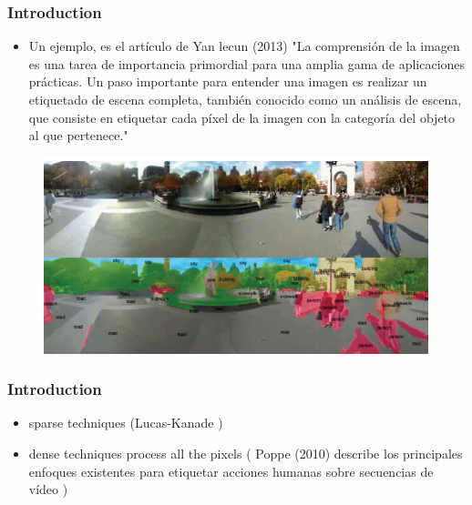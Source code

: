 \documentclass{beamer}
\begin{document}
\begin{frame}
\frametitle{Introduction}
\begin{itemize}
\item Un ejemplo, es el artículo de Yan lecun (2013) "La comprensión de la imagen es una tarea de importancia primordial para una amplia gama de aplicaciones prácticas. Un paso importante para entender una imagen es realizar un etiquetado de escena completa, también conocido como un análisis de escena, que consiste en etiquetar cada píxel de la imagen con la categoría del objeto al que pertenece."
\end{itemize}
 \begin{figure}
\includegraphics[width=0.8\linewidth]{img2/mccn.png}
\end{figure}

\end{frame}


\begin{frame}
\frametitle{Introduction}
\begin{itemize}
\item sparse techniques (Lucas-Kanade )

\item  dense techniques process all the pixels ( Poppe (2010)  describe los principales enfoques existentes para etiquetar acciones humanas sobre secuencias de vídeo 
)
\end{itemize}

\end{frame}
\end{document}
